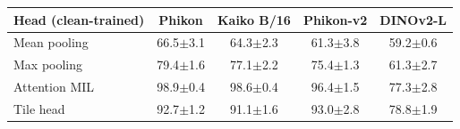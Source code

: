 \begin{tabular}{@{}lcccc@{}}
\toprule
Head (clean-trained) & Phikon & Kaiko B/16 & Phikon-v2 & DINOv2-L\\
\midrule
Mean pooling & 66.5{\scriptsize$\pm$3.1} & 64.3{\scriptsize$\pm$2.3} & 61.3{\scriptsize$\pm$3.8} & 59.2{\scriptsize$\pm$0.6}\\
Max pooling & 79.4{\scriptsize$\pm$1.6} & 77.1{\scriptsize$\pm$2.2} & 75.4{\scriptsize$\pm$1.3} & 61.3{\scriptsize$\pm$2.7}\\
Attention MIL & 98.9{\scriptsize$\pm$0.4} & 98.6{\scriptsize$\pm$0.4} & 96.4{\scriptsize$\pm$1.5} & 77.3{\scriptsize$\pm$2.8}\\
Tile head & 92.7{\scriptsize$\pm$1.2} & 91.1{\scriptsize$\pm$1.6} & 93.0{\scriptsize$\pm$2.8} & 78.8{\scriptsize$\pm$1.9}\\
\bottomrule
\end{tabular}